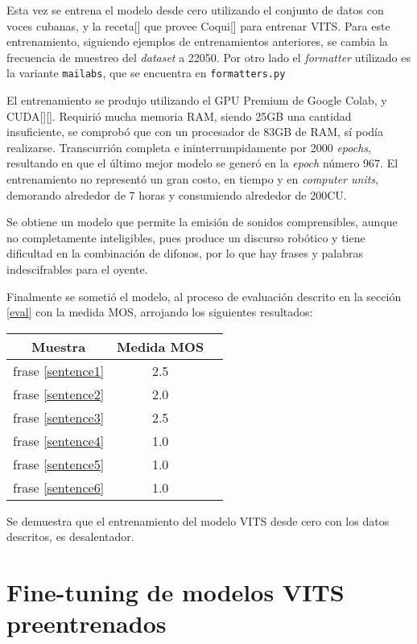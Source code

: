 Esta vez se entrena el modelo desde cero utilizando el conjunto de datos con voces cubanas, y la receta[\cite{train-vits}] que provee Coqui[\cite{coqui-doc}] para entrenar VITS. Para este entrenamiento, siguiendo ejemplos de entrenamientos anteriores, se cambia la frecuencia de muestreo del \textit{dataset} a 22050. Por otro lado el \textit{formatter} utilizado es la variante \texttt{mailabs}, que se encuentra en \texttt{formatters.py}

El entrenamiento se produjo utilizando el GPU Premium de Google Colab, y CUDA[\cite{cuda}][\cite{cuda1}]. Requirió mucha memoria RAM, siendo 25GB una cantidad insuficiente, se comprobó que con un procesador de 83GB de RAM, sí podía realizarse. Transcurrión completa e ininterrumpidamente por 2000 \textit{epochs}, resultando en que el último mejor modelo se generó en la \textit{epoch} número 967. El entrenamiento no representó un gran costo, en tiempo y en \textit{computer units}, demorando alrededor de 7 horas y consumiendo alrededor de 200CU.

Se obtiene un modelo que permite la emisión de sonidos comprensibles, aunque no completamente inteligibles, pues produce un discurso robótico y tiene dificultad en la combinación de difonos, por lo que hay frases y palabras indescifrables para el oyente.

Finalmente se sometió el modelo, al proceso de evaluación descrito en la sección \ref{eval} con la medida MOS, arrojando los siguientes resultados:

\begin{center} \begin{tabular}{ |c|c|c| } 
\hline 
Muestra & Medida MOS \\
\hline
frase \ref{sentence1} & 2.5 \\
frase \ref{sentence2} & 2.0 \\
frase \ref{sentence3} & 2.5 \\
frase \ref{sentence4} & 1.0 \\
frase \ref{sentence5} & 1.0 \\
frase \ref{sentence6} & 1.0 \\
 \hline 
\end{tabular} 
\end{center}

Se demuestra que el entrenamiento del modelo VITS desde cero con los datos descritos, es desalentador.


\section{Fine-tuning de modelos VITS preentrenados}

